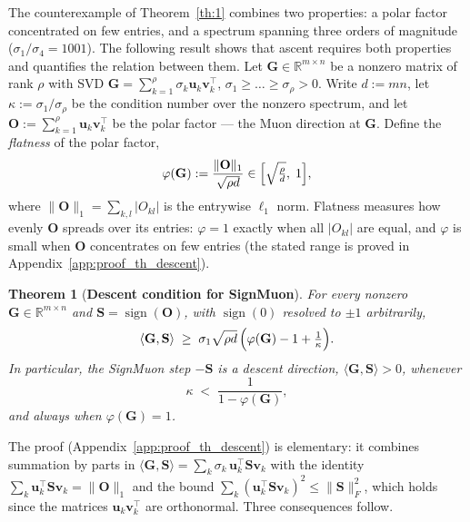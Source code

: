 \documentclass{article}
\newtheorem{theorem}{Theorem}
\begin{document}
The counterexample of Theorem~\ref{th:1} combines two properties: a polar factor concentrated on few entries, and a spectrum spanning three orders of magnitude ($\sigma_1/\sigma_4 = 1001$). The following result shows that ascent requires both properties and quantifies the relation between them. Let $\mathbf{G} \in \mathbb{R}^{m\times n}$ be a nonzero matrix of rank $\rho$ with SVD $\mathbf{G}=\sum_{k=1}^{\rho}\sigma_k\mathbf{u}_k\mathbf{v}_k^\top$, $\sigma_1 \ge \dots \ge \sigma_\rho > 0$. Write $d := mn$, let $\kappa := \sigma_1/\sigma_\rho$ be the condition number over the nonzero spectrum, and let $\mathbf{O} := \sum_{k=1}^{\rho}\mathbf{u}_k\mathbf{v}_k^\top$ be the polar factor --- the Muon direction at $\mathbf{G}$. Define the \emph{flatness} of the polar factor,
\begin{equation}
\varphi(\mathbf{G}) := \frac{\|\mathbf{O}\|_1}{\sqrt{\rho d}} \in \Bigl[\sqrt{\tfrac{\rho}{d}},\; 1\Bigr],
\end{equation}
where $\|\mathbf{O}\|_1 = \sum_{k,l}|O_{kl}|$ is the entrywise $\ell_1$ norm. Flatness measures how evenly $\mathbf{O}$ spreads over its entries: $\varphi = 1$ exactly when all $|O_{kl}|$ are equal, and $\varphi$ is small when $\mathbf{O}$ concentrates on few entries (the stated range is proved in Appendix~\ref{app:proof_th_descent}).

\begin{theorem}[\textbf{Descent condition for SignMuon}]\label{th:descent}
For every nonzero $\mathbf{G} \in \mathbb{R}^{m\times n}$ and $\mathbf{S} = \operatorname{sign}(\mathbf{O})$, with $\operatorname{sign}(0)$ resolved to $\pm1$ arbitrarily,
\begin{equation}\label{eq:descent_margin}
\langle \mathbf{G}, \mathbf{S}\rangle \;\ge\; \sigma_1\sqrt{\rho d}\,\Bigl(\varphi(\mathbf{G}) - 1 + \tfrac{1}{\kappa}\Bigr).
\end{equation}
In particular, the SignMuon step $-\mathbf{S}$ is a descent direction, $\langle \mathbf{G}, \mathbf{S}\rangle > 0$, whenever
\begin{equation}\label{eq:kappa_threshold}
\kappa \;<\; \frac{1}{1-\varphi(\mathbf{G})},
\end{equation}
and always when $\varphi(\mathbf{G}) = 1$.
\end{theorem}

The proof (Appendix~\ref{app:proof_th_descent}) is elementary: it combines summation by parts in $\langle\mathbf{G},\mathbf{S}\rangle=\sum_k\sigma_k\,\mathbf{u}_k^\top\mathbf{S}\mathbf{v}_k$ with the identity $\sum_k \mathbf{u}_k^\top\mathbf{S}\mathbf{v}_k=\|\mathbf{O}\|_1$ and the bound $\sum_k (\mathbf{u}_k^\top\mathbf{S}\mathbf{v}_k)^2 \le \|\mathbf{S}\|_F^2$, which holds since the matrices $\mathbf{u}_k\mathbf{v}_k^\top$ are orthonormal. Three consequences follow.
\end{document}
